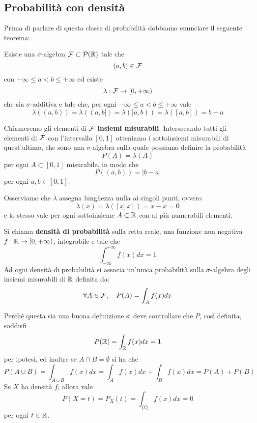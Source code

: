 \subsection{Probabilità con densità}
Prima di parlare di questa classe di probabilità dobbiamo enunciare il seguente teorema:
\begin{theorem}
	Esiste una $\sigma$-algebra $\mathcal{F} \subset \mathcal{P}(\mathbb{R})$ tale che
	\[ (a, b) \in \mathcal{F} \]
	con $-\infty \leq a < b \leq +\infty$ ed esiste
	\[ \lambda : \mathcal{F} \to [0, +\infty) \]
			che sia $\sigma$-additiva e tale che, per ogni $-\infty \leq a < b \leq +\infty$ vale
			\[ \lambda((a,b)) = \lambda((a,b]) = \lambda ([a,b)) = \lambda([a,b]) = b - a \]
\end{theorem}

Chiameremo gli elementi di $\mathcal{F}$ \textbf{insiemi misurabili}. Intersecando tutti gli elementi di
$\mathcal{F}$ con l'intervallo $[0,1]$ otteniamo i sottoinsiemi misurabili di quest'ultimo, che sono una
$\sigma$-algebra sulla quale possiamo definire la probabilità
\[ P (A) = \lambda (A) \]
per ogni $A \subset [0,1]$ misurabile, in modo che
\[ P((a, b)) = |b - a| \]
per ogni $a,b \in [0,1]$.

\begin{observation}
	Osserviamo che $\lambda$ assegna lunghezza nulla ai singoli punti, ovvero
	\[ \lambda(x) = \lambda([x,x]) = x - x = 0 \]
	e lo stesso vale per ogni sottoinsieme $A \subset \mathbb{R}$ con al più numerabili elementi.
\end{observation}

\begin{definition}
	Si chiama \textbf{densità di probabilità} sulla retta reale, una funzione non negativa
	$f : \mathbb{R} \to [0, +\infty)$, integrabile e tale che
	\[ \int_{-\infty}^{+\infty} f(x) dx = 1 \]
	Ad ogni densità di probabilità si associa un'unica probabilità sulla $\sigma$-algebra degli
	insiemi misurabili di $\mathbb{R}$ definita da:
	\[ \forall A \in \mathcal{F}, \quad P(A) = \int_A f(x) dx \]
\end{definition}

Perché questa sia una buona definizione si deve controllare che $P$, così definita, soddisfi
\[ P(\mathbb{R}) = \int_{\mathbb{R}} f(x) dx = 1 \]
per ipotesi, ed inoltre se $A \cap B = \emptyset$ si ha che
\[ P(A \cup B) = \int_{A \cup B} f(x) dx = \int_A f(x) dx + \int_B f(x) dx = P(A) + P(B) \]
Se $X$ ha densità $f$, allora vale
\[ P(X = t) = P_X (t) = \int_{\{t\}} f(x) dx = 0 \]
per ogni $t \in \mathbb{R}$.